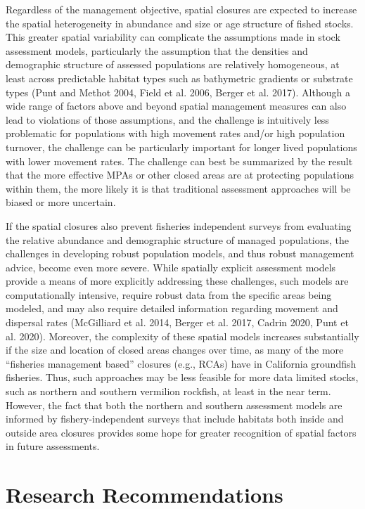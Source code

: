 \documentclass[
  english,
  a4paper,
]{article}
\begin{document}
Regardless of the management objective, spatial closures are expected to increase the spatial heterogeneity in abundance and size or age structure of fished stocks. This greater spatial variability can complicate the assumptions made in stock assessment models, particularly the assumption that the densities and demographic structure of assessed populations are relatively homogeneous, at least across predictable habitat types such as bathymetric gradients or substrate types (Punt and Methot 2004, Field et al. 2006, Berger et al. 2017). Although a wide range of factors above and beyond spatial management measures can also lead to violations of those assumptions, and the challenge is intuitively less problematic for populations with high movement rates and/or high population turnover, the challenge can be particularly important for longer lived populations with lower movement rates. The challenge can best be summarized by the result that the more effective MPAs or other closed areas are at protecting populations within them, the more likely it is that traditional assessment approaches will be biased or more uncertain.

If the spatial closures also prevent fisheries independent surveys from evaluating the relative abundance and demographic structure of managed populations, the challenges in developing robust population models, and thus robust management advice, become even more severe. While spatially explicit assessment models provide a means of more explicitly addressing these challenges, such models are computationally intensive, require robust data from the specific areas being modeled, and may also require detailed information regarding movement and dispersal rates (McGilliard et al. 2014, Berger et al. 2017, Cadrin 2020, Punt et al. 2020). Moreover, the complexity of these spatial models increases substantially if the size and location of closed areas changes over time, as many of the more ``fisheries management based'' closures (e.g., RCAs) have in California groundfish fisheries. Thus, such approaches may be less feasible for more data limited stocks, such as northern and southern vermilion rockfish, at least in the near term. However, the fact that both the northern and southern assessment models are informed by fishery-independent surveys that include habitats both inside and outside area closures provides some hope for greater recognition of spatial factors in future assessments.

\hypertarget{research-recommendations}{%
\section{Research Recommendations}\label{research-recommendations}}
\end{document}
